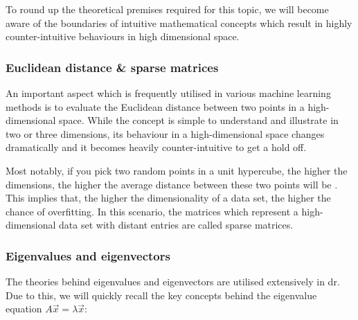 To round up the theoretical premises required for this topic, we will become aware of the boundaries of intuitive mathematical concepts which result in highly counter-intuitive behaviours in high dimensional space.

\subsubsection{Euclidean distance \& sparse matrices}

An important aspect which is frequently utilised in various machine learning methods is to evaluate the Euclidean distance between two points in a high-dimensional space.
While the concept is simple to understand and illustrate in two or three dimensions, its behaviour in a high-dimensional space changes dramatically and it becomes heavily counter-intuitive to get a hold off.

Most notably, if you pick two random points in a unit \gls{hypercube}, the higher the dimensions, the higher the average distance between these two points will be \cite{HandsOnMLCh8}.
This implies that, the higher the dimensionality of a data set, the higher the chance of overfitting.
In this scenario, the matrices which represent a high-dimensional data set with distant entries are called sparse matrices.

\vspace{2mm}



\subsubsection{Eigenvalues and eigenvectors}

The theories behind eigenvalues and eigenvectors are utilised extensively in \acrlong{dr}.
Due to this, we will quickly recall the key concepts behind the eigenvalue equation $A \overrightarrow{x} = \lambda \overrightarrow{x}$:


